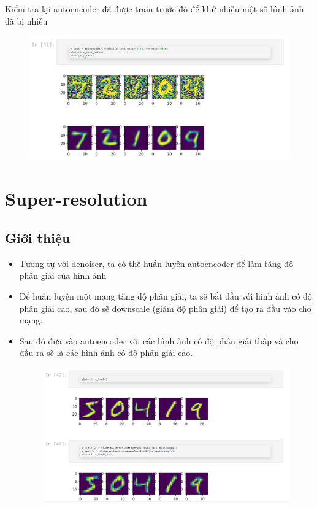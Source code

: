 \documentclass{book}
\begin{document}
Kiểm tra lại autoencoder đã được train trước đó để khử nhiễu một số hình ảnh đã bị nhiễu

\begin{figure}[H]
	\centering
	\includegraphics[width=0.75\linewidth]{images/au16.png}
\end{figure}

\section{Super-resolution}
\subsection{Giới thiệu}
\begin{itemize}
	\item Tương tự với denoiser, ta có thể huấn luyện autoencoder để làm tăng độ phân giải của hình ảnh
	\item Để huấn luyện một mạng tăng độ phân giải, ta sẽ bắt đầu với hình ảnh có độ phân giải cao, sau đó sẽ downscale (giảm độ phân giải) để tạo ra đầu vào cho mạng.
	\item Sau đó đưa vào autoencoder với các hình ảnh có độ phân giải thấp và cho đầu ra sẽ là các hình ảnh có độ phân giải cao.
	\begin{figure}[H]
		\centering
		\includegraphics[width=0.75\linewidth]{images/au17.png}
	\end{figure}
\end{itemize}
\end{document}
